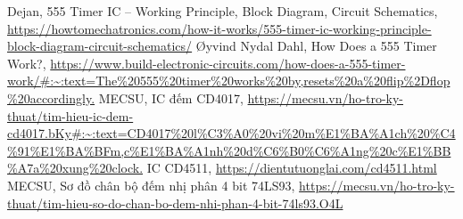 \documentclass{article}
\begin{document}

% 
\begin{thebibliography}{90}
\bibitem{} Dejan, 555 Timer IC – Working Principle, Block Diagram, Circuit Schematics, \url{https://howtomechatronics.com/how-it-works/555-timer-ic-working-principle-block-diagram-circuit-schematics/}
\bibitem{} Øyvind Nydal Dahl, How Does a 555 Timer Work?, \url{https://www.build-electronic-circuits.com/how-does-a-555-timer-work/#:~:text=The%20555%20timer%20works%20by,resets%20a%20flip%2Dflop%20accordingly.}
\bibitem{} MECSU, IC đếm CD4017, \url{https://mecsu.vn/ho-tro-ky-thuat/tim-hieu-ic-dem-cd4017.bKy#:~:text=CD4017%20l%C3%A0%20vi%20m%E1%BA%A1ch%20%C4%91%E1%BA%BFm,c%E1%BA%A1nh%20d%C6%B0%C6%A1ng%20c%E1%BB%A7a%20xung%20clock.}
\bibitem{} IC CD4511, \url{https://dientutuonglai.com/cd4511.html}
\bibitem{} MECSU, Sơ đồ chân bộ đếm nhị phân 4 bit 74LS93, \url{https://mecsu.vn/ho-tro-ky-thuat/tim-hieu-so-do-chan-bo-dem-nhi-phan-4-bit-74ls93.O4L}

\end{thebibliography}

\newpage

\nocite{*}
\end{document}

